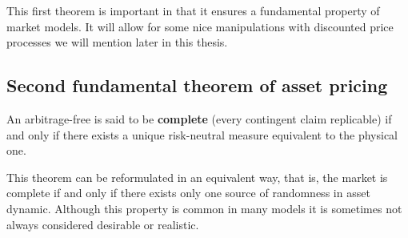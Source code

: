 \documentclass[times, utf8, diplomski]{fer}
\begin{document}
\hfill \break
This first theorem is important in that it ensures a fundamental property of market models. It will allow for some nice manipulations with discounted price processes we will mention later in this thesis.




\subsection{Second fundamental theorem of asset pricing}
\begin{theorem} \label{tm:ftap2}
	An arbitrage-free is said to be \textbf{complete} (every contingent claim replicable) if and only if there exists a unique risk-neutral measure equivalent to the physical one.
\end{theorem}

\hfill \break
This theorem can be reformulated in an equivalent way, that is, the market is complete if and only if there exists only one source of randomness in asset dynamic. Although this property is common in many models it is sometimes not always considered desirable or realistic. 
\end{document}
